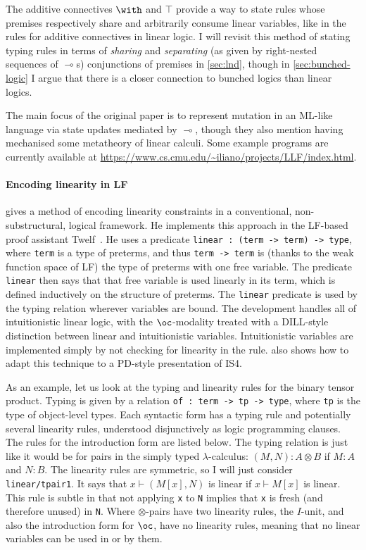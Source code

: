 The additive connectives $\with$ and $\top$ provide a way to state rules whose
premises respectively share and arbitrarily consume linear variables, like in
the rules for additive connectives in linear logic.
I will revisit this method of stating typing rules in terms of \emph{sharing}
and \emph{separating} (as given by right-nested sequences of $\multimap$s)
conjunctions of premises in \cref{sec:lnd}, though in \cref{sec:bunched-logic}
I argue that there is a closer connection to bunched logics than linear logics.

The main focus of the original paper is to represent mutation in an ML-like
language via state updates mediated by $\multimap$, though they also mention
having mechanised some metatheory of linear calculi.
Some example programs are currently available at
\url{https://www.cs.cmu.edu/~iliano/projects/LLF/index.html}.

\paragraph{Encoding linearity in LF}
 gives a method of encoding linearity constraints in a
conventional, non-substructural, logical framework.
He implements this approach in the LF-based proof assistant Twelf~\citep{Twelf}.
He uses a predicate \texttt{linear : (term -> term) -> type}, where
\texttt{term} is a type of preterms, and thus \texttt{term -> term} is (thanks
to the weak function space of LF) the type of preterms with one free variable.
The predicate \texttt{linear} then says that that free variable is used linearly
in its term, which is defined inductively on the structure of preterms.
The \texttt{linear} predicate is used by the typing relation wherever variables
are bound.
The development handles all of intuitionistic linear logic, with the
$\oc$-modality treated with a DILL-style distinction between linear and
intuitionistic variables.
Intuitionistic variables are implemented simply by not checking for linearity in
the  rule.
 also shows how to adapt this technique to a PD-style
presentation of IS4.

As an example, let us look at the typing and linearity rules for the binary
tensor product.
Typing is given by a relation \texttt{of : term -> tp -> type}, where
\texttt{tp} is the type of object-level types.
Each syntactic form has a typing rule and potentially several linearity rules,
understood disjunctively as logic programming clauses.
The rules for the introduction form are listed below.
The typing relation is just like it would be for pairs in the simply typed
$\lambda$-calculus: $(M, N) : A \otimes B$ if $M : A$ and $N : B$.
The linearity rules are symmetric, so I will just consider
\texttt{linear/tpair1}.
It says that $x \vdash (M[x], N)$ is linear if $x \vdash M[x]$ is linear.
This rule is subtle in that not applying \texttt{x} to \texttt{N} implies that
\texttt{x} is fresh (and therefore unused) in \texttt{N}.
Where $\otimes$-pairs have two linearity rules, the $I$-unit, and also the
introduction form for $\oc$, have no linearity rules, meaning that no linear
variables can be used in or by them.

